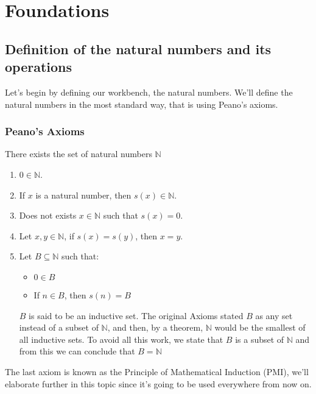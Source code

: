 \documentclass{report}
\begin{document}
    \tableofcontents

    \pagebreak
    \chapter{ Foundations }

    \section{Definition of the natural numbers and its operations}
    Let's begin by defining our workbench, the natural numbers. We'll define the natural numbers in the most standard way, that is using Peano's axioms.

    \subsection*{Peano's Axioms}
    There exists the set of natural numbers $\mathbb{N}$
    \begin{enumerate}
        \item $0 \in \mathbb{N}$.
        \item If $x$ is a natural number, then $s(x)\in \mathbb{N}$.
        \item Does not exists $x \in \mathbb{N}$ such that $s(x) = 0$.
        \item Let $x,y \in \mathbb{N}$, if $s(x) = s(y)$, then $x=y$.
        \item Let $B \subseteq \mathbb{N}$ such that:
            \begin{itemize}
                \item $0 \in B$
                \item If $n\in B$, then $s(n)=B$
            \end{itemize}
        \begin{noteBox}
            $B$ is said to be an inductive set. The original Axioms stated $B$ as any set instead of a subset of $\mathbb{N}$, and then, by a theorem, $\mathbb{N}$ would be the smallest of all inductive sets. To avoid all this work, we state that $B$ is a subset of $\mathbb{N}$ and from this we can conclude that $B = \mathbb{N}$
        \end{noteBox}
    \end{enumerate}

    The last axiom is known as the Principle of Mathematical Induction (PMI), we'll elaborate further in this topic since it's going to be used everywhere from now on.
\end{document}
